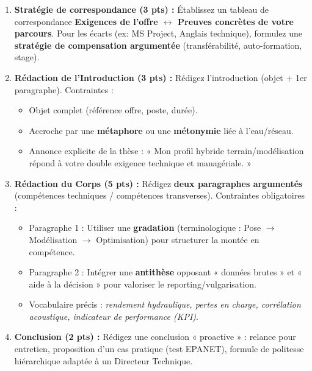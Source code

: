 \documentclass[11pt]{article}
\begin{document}
\begin{exercice}
\begin{enumerate}
    \item \textbf{Stratégie de correspondance (3 pts) :} Établissez un tableau de correspondance \textbf{Exigences de l'offre $\leftrightarrow$ Preuves concrètes de votre parcours}. Pour les écarts (ex: MS Project, Anglais technique), formulez une \textbf{stratégie de compensation argumentée} (transférabilité, auto-formation, stage).
    \item \textbf{Rédaction de l'Introduction (3 pts) :} Rédigez l'introduction (objet + 1er paragraphe). Contraintes : 
    \begin{itemize}
        \item Objet complet (référence offre, poste, durée).
        \item Accroche par une \textbf{métaphore} ou une \textbf{métonymie} liée à l'eau/réseau.
        \item Annonce explicite de la thèse : « Mon profil hybride terrain/modélisation répond à votre double exigence technique et managériale. »
    \end{itemize}
    \item \textbf{Rédaction du Corps (5 pts) :} Rédigez \textbf{deux paragraphes argumentés} (compétences techniques / compétences transverses). Contraintes obligatoires :
    \begin{itemize}
        \item Paragraphe 1 : Utiliser une \textbf{gradation} (terminologique : Pose $\rightarrow$ Modélisation $\rightarrow$ Optimisation) pour structurer la montée en compétence.
        \item Paragraphe 2 : Intégrer une \textbf{antithèse} opposant « données brutes » et « aide à la décision » pour valoriser le reporting/vulgarisation.
        \item Vocabulaire précis : \textit{rendement hydraulique, pertes en charge, corrélation acoustique, indicateur de performance (KPI)}.
    \end{itemize}
    \item \textbf{Conclusion (2 pts) :} Rédigez une conclusion « proactive » : relance pour entretien, proposition d'un cas pratique (test EPANET), formule de politesse hiérarchique adaptée à un Directeur Technique.
\end{enumerate}
\end{exercice}
\end{document}
